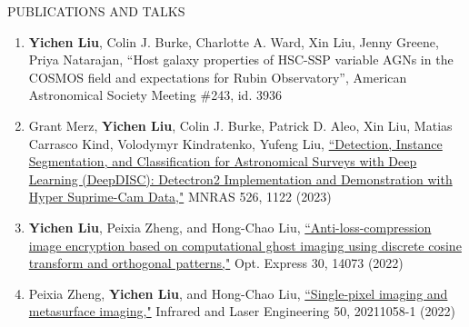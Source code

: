 \documentclass[10pt]{article} %
\begin{document}
\begin{section}{PUBLICATIONS AND TALKS}
    
\begin{enumerate}[leftmargin=1.5em]
    \item \textbf{Yichen Liu}, Colin J. Burke, Charlotte A. Ward, Xin Liu, Jenny Greene, Priya Natarajan, ``Host galaxy properties of HSC-SSP variable AGNs in the COSMOS field and expectations for Rubin Observatory'', American Astronomical Society Meeting \#243, id. 3936
    \item Grant Merz, \textbf{Yichen Liu}, Colin J. Burke, Patrick D. Aleo, Xin Liu, Matias Carrasco Kind, Volodymyr Kindratenko, Yufeng Liu, \href{https://academic.oup.com/mnras/advance-article-abstract/doi/10.1093/mnras/stad2785/7273850?redirectedFrom=fulltext}{``Detection, Instance Segmentation, and Classification for Astronomical Surveys with Deep Learning (DeepDISC): Detectron2 Implementation and Demonstration with Hyper Suprime-Cam Data,"} MNRAS 526, 1122 (2023)
    \item \textbf{Yichen Liu}, Peixia Zheng, and Hong-Chao Liu, \href{https://opg.optica.org/oe/fulltext.cfm?uri=oe-30-9-14073&id=471300}{``Anti-loss-compression image encryption based on computational ghost imaging using discrete cosine transform and orthogonal patterns,"} Opt. Express 30, 14073 (2022)
    \item Peixia Zheng, \textbf{Yichen Liu}, and Hong-Chao Liu, \href{http://www.irla.cn/cn/article/doi/10.3788/IRLA20211058}{``Single-pixel imaging and metasurface imaging,"} Infrared and Laser Engineering 50, 20211058-1 (2022)
\end{enumerate}

\end{section}
\end{document}
